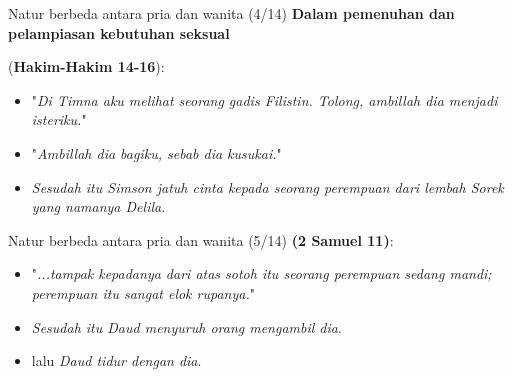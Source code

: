 \documentclass{beamer}
\theoremstyle{mystyle}
\let\emph\relax %
\begin{document}
\begin{frame}{Natur berbeda antara pria dan wanita (4/14)}
	\textbf{Dalam pemenuhan dan pelampiasan kebutuhan seksual}
	
	\bigskip
	 \emph{Samson} (\textbf{Hakim-Hakim 14-16}):
\begin{itemize}
	\item<3-> "\textit{Di Timna aku melihat seorang gadis Filistin. Tolong, ambillah dia menjadi isteriku.}"
	\item<4-> "\textit{Ambillah dia bagiku, sebab dia kusukai.}"
	\item<5-> \textit{Sesudah itu Simson jatuh cinta kepada seorang perempuan dari lembah Sorek yang namanya Delila}.
\end{itemize}
\end{frame}

\begin{frame}{Natur berbeda antara pria dan wanita (5/14)}
	\emph{Daud} \textbf{(2 Samuel 11)}: 
	\begin{itemize}
		\item<2-> "\textit{...tampak kepadanya dari atas sotoh itu seorang perempuan sedang mandi; perempuan itu sangat elok rupanya.}" 
		\item<3-> \textit{Sesudah itu Daud menyuruh orang mengambil dia}.
		\item<4-> lalu \textit{Daud tidur dengan dia}.
	\end{itemize}		
\end{frame}
\end{document}
